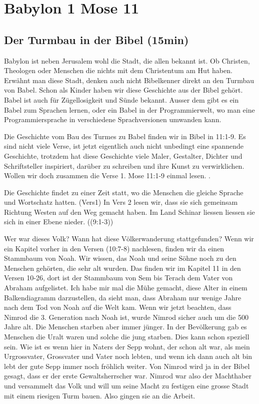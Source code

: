 \documentclass[14pt]{../../inc/mybib}
\author{Lothar Schmid}
\begin{document}
\setlength{\baselineskip}{1.5\baselineskip}
\section{Babylon 1 Mose 11}

\subsection{Der Turmbau in der Bibel (15min)}        
    Babylon ist neben Jerusalem wohl die Stadt, die allen bekannt ist. Ob Christen, Theologen oder Menschen die nichts mit dem Christentum am Hut haben. Erwähnt man diese Stadt, denken auch nicht Bibelkenner direkt an den Turmbau von Babel. Schon als Kinder haben wir diese Geschichte aus der Bibel gehört. Babel ist auch für Zügellosigkeit und Sünde bekannt. Ausser dem gibt es ein Babel zum Sprachen lernen, oder ein Babel in der Programmierwelt, wo man eine Programmiersprache in verschiedene Sprachversionen umwanden kann.
    
    Die Geschichte vom Bau des Turmes zu Babel finden wir in Bibel in  {11:1-9}. Es sind nicht viele Verse, ist jetzt eigentlich auch nicht unbedingt eine spannende Geschichte, trotzdem hat diese Geschichte viele Maler, Gestalter, Dichter und Schriftsteller inspiriert, darüber zu schreiben und ihre Kunst zu verwirklichen. Wollen wir doch zusammen die Verse 1. Mose 11:1-9 einmal lesen. .

    Die Geschichte findet zu einer Zeit statt, wo die Menschen die gleiche Sprache und Wortschatz hatten. (Vers1) In Vers 2 lesen wir, dass sie sich gemeinsam Richtung Westen auf den Weg gemacht haben. Im Land Schinar liessen liessen sie sich in einer Ebene nieder.  ((9:1-3))

    Wer war dieses Volk? Wann hat diese Völkerwanderung stattgefunden? Wenn wir ein Kapitel vorher in den Versen  (10:7-8) nachlesen, finden wir da einen Stammbaum von Noah. Wir wissen, das Noah und seine Söhne noch zu den Menschen gehörten, die sehr alt wurden. Das finden wir im Kapitel 11 in den Versen 10-26, dort ist der Stammbaum von Sem bis Terach dem Vater von Abraham aufgelistet. Ich habe mir mal die Mühe gemacht, diese Alter in einem Balkendiagramm darzustellen, da sieht man, dass Abraham nur wenige Jahre nach dem Tod von Noah auf die Welt kam. Wenn wir jetzt beachten, dass Nimrod die 3. Generation nach Noah ist, wurde Nimrod sicher auch um die 500 Jahre alt. Die Menschen starben aber immer jünger. In der Bevölkerung gab es Menschen die Uralt waren und solche die jung starben. Dies kann schon speziell sein. Wie ist es wenn hier in Naters der Sepp wohnt, der schon alt war, als mein Urgrossvater, Grossvater und Vater noch lebten, und wenn ich dann auch alt bin lebt der gute Sepp immer noch fröhlich weiter. Von Nimrod wird ja in der Bibel gesagt, dass er der erste Gewaltsherrscher war. Nimrod war also der Machthaber und versammelt das Volk und will um seine Macht zu festigen eine grosse Stadt mit einem riesigen Turm bauen. Also gingen sie an die Arbeit. 
\end{document}
